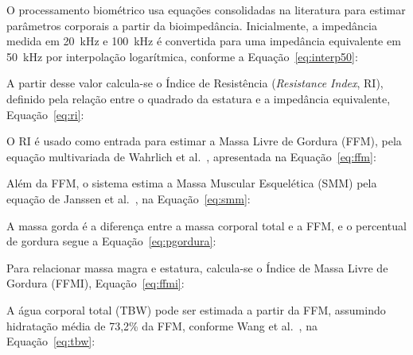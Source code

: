 O processamento biométrico usa equações consolidadas na literatura para estimar parâmetros
corporais a partir da bioimpedância. Inicialmente, a impedância medida em 20~kHz e 100~kHz é
convertida para uma impedância equivalente em 50~kHz por interpolação logarítmica, conforme
a Equação~\ref{eq:interp50}:


A partir desse valor calcula-se o Índice de Resistência (\emph{Resistance Index}, RI),
definido pela relação entre o quadrado da estatura e a impedância equivalente,
Equação~\ref{eq:ri}:


O RI é usado como entrada para estimar a Massa Livre de Gordura (FFM), pela equação
multivariada de Wahrlich et al.~\cite{wahrlich2026}, apresentada na
Equação~\ref{eq:ffm}:


Além da FFM, o sistema estima a Massa Muscular Esquelética (SMM) pela equação de Janssen et
al.~\cite{janssen2000}, na Equação~\ref{eq:smm}:


A massa gorda é a diferença entre a massa corporal total e a FFM, e o percentual de gordura
segue a Equação~\ref{eq:pgordura}:


Para relacionar massa magra e estatura, calcula-se o Índice de Massa Livre de Gordura
(FFMI), Equação~\ref{eq:ffmi}:


A água corporal total (TBW) pode ser estimada a partir da FFM, assumindo hidratação média de
73,2\% da FFM, conforme Wang et al.~\cite{wang1999}, na Equação~\ref{eq:tbw}:

